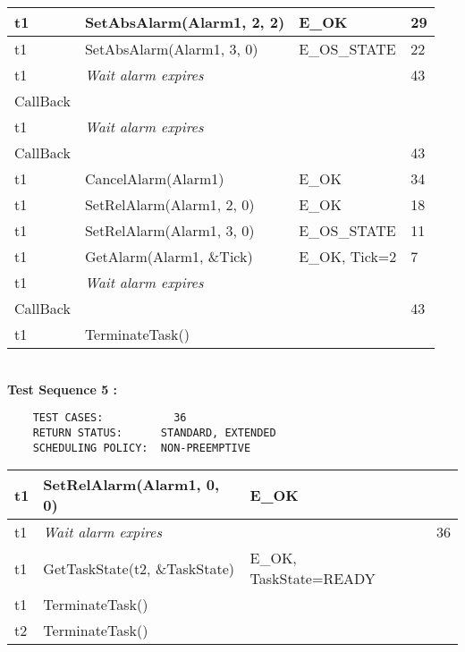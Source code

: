 \documentclass[10pt]{article}
\newlength{\Li}\settowidth{\Li}{Running}
\newlength{\Lii}\setlength{\Lii}{7cm}
\newlength{\Liiii}\setlength{\Liiii}{0.9cm}
\newlength{\Liii}\setlength{\Liii}{\textwidth} \addtolength{\Liii}{-\Li} \addtolength{\Liii}{-\Lii} \addtolength{\Liii}{-\Liiii}
\begin{document}
	\begin{supertabular}{|p{\Li}|p{\Lii}|p{\Liii}|p{\Liiii}|} \hline 
	t1 	& SetAbsAlarm(Alarm1, 2, 2)						& E\_OK 			& 29 \\ \hline 
	t1 	& SetAbsAlarm(Alarm1, 3, 0) 						& E\_OS\_STATE 	& 22 \\ \hline
	t1 	& \textit{Wait alarm expires}					 	& 				& 43 \\ \hline 
	CallBack 	& 									 	& 				& \\ \hline 
	t1 	& \textit{Wait alarm expires}					 	& 				& \\ \hline 
	CallBack 	& 						 				& 				& 43 \\ \hline 
	t1 	& CancelAlarm(Alarm1)							& E\_OK 			& 34 \\ \hline  
	t1 	& SetRelAlarm(Alarm1, 2, 0)						& E\_OK 			& 18 \\ \hline 
	t1 	& SetRelAlarm(Alarm1, 3, 0) 						& E\_OS\_STATE 	& 11 \\ \hline 
	t1 	& GetAlarm(Alarm1, \&Tick)						& E\_OK, Tick=2 	& 7 \\ \hline 
	t1 	& \textit{Wait alarm expires}					 	& 				& \\ \hline 
	CallBack 	& 									 	& 				& 43 \\ \hline 
	t1 	& TerminateTask()								& 				& \\ \hline 	
	\end{supertabular} \\
	
	\textbf{Test Sequence 5 :}
	\begin{lstlisting}
	TEST CASES:		      36
	RETURN STATUS:	    STANDARD, EXTENDED
	SCHEDULING POLICY:  NON-PREEMPTIVE
	\end{lstlisting}
	
	
	\begin{supertabular}{|p{\Li}|p{\Lii}|p{\Liii}|p{\Liiii}|} \hline 
	t1 	& SetRelAlarm(Alarm1, 0, 0)				& E\_OK					& \\ \hline 
	t1	& \textit{Wait alarm expires}			 	& 						& 36 \\ \hline 
	t1	& GetTaskState(t2, \&TaskState)			& E\_OK, TaskState=READY	& \\ \hline 
	t1	& TerminateTask()						&						&\\ \hline 
	t2 	& TerminateTask() 						& 						& \\ \hline 
	\end{supertabular} \\
	
\end{document}
